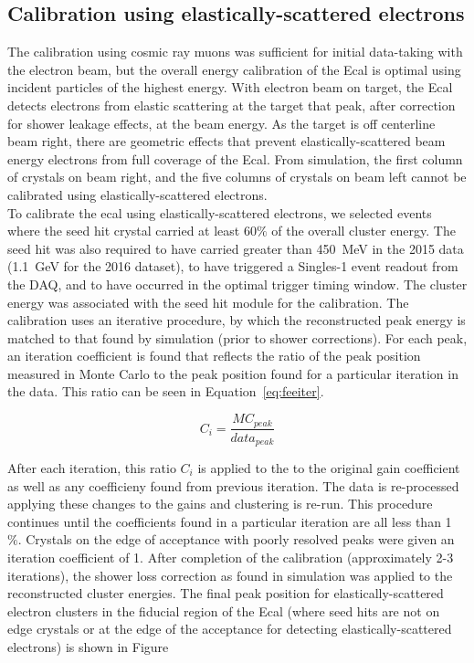 \documentclass[12pt]{report}
\begin{document}
\subsection{Calibration using elastically-scattered electrons}

The calibration using cosmic ray muons was sufficient for initial data-taking with the electron beam, but the overall energy calibration of the Ecal is optimal using incident particles of the highest energy. With electron beam on target, the Ecal detects electrons from elastic scattering at the target that peak, after correction for shower leakage effects, at the beam energy. As the target is off centerline beam right, there are geometric effects that prevent elastically-scattered beam energy electrons from full coverage of the Ecal. From simulation, the first column of crystals on beam right, and the five columns of crystals on beam left cannot be calibrated using elastically-scattered electrons. \\
\indent To calibrate the ecal using elastically-scattered electrons, we selected events where the seed hit crystal carried at least 60$\%$ of the overall cluster energy. The seed hit was also required to have carried greater than 450~MeV in the 2015 data (1.1~GeV for the 2016 dataset), to have triggered a Singles-1  event readout from the DAQ, and to have occurred in the optimal trigger timing window. The cluster energy was associated with the seed hit module for the calibration. The calibration uses an iterative procedure, by which the reconstructed peak energy is matched to that found by simulation (prior to shower corrections). For each peak, an iteration coefficient is found that reflects the ratio of the peak position measured in Monte Carlo to the peak position found for a particular iteration in the data. This ratio can be seen in Equation~\eqref{eq:feeiter}.

\begin{equation}
	\label{eq:feeiter}
	C_i = \dfrac{MC_{peak}}{data_{peak}}
\end{equation}

After each iteration, this ratio $C_i$ is applied to the to the original gain coefficient as well as any coefficieny found from previous iteration. The data is re-processed applying these changes to the gains and clustering is re-run. This procedure continues until the coefficients found in a particular iteration are all less than 1~$\%$. Crystals on the edge of acceptance with poorly resolved peaks were given an iteration coefficient of 1. After completion of the calibration (approximately 2-3 iterations), the shower loss correction as found in simulation was applied to the reconstructed cluster energies. The final peak position for elastically-scattered electron clusters in the fiducial region of the Ecal (where seed hits are not on edge crystals or at the edge of the acceptance for detecting elastically-scattered electrons) is shown in Figure
\end{document}
